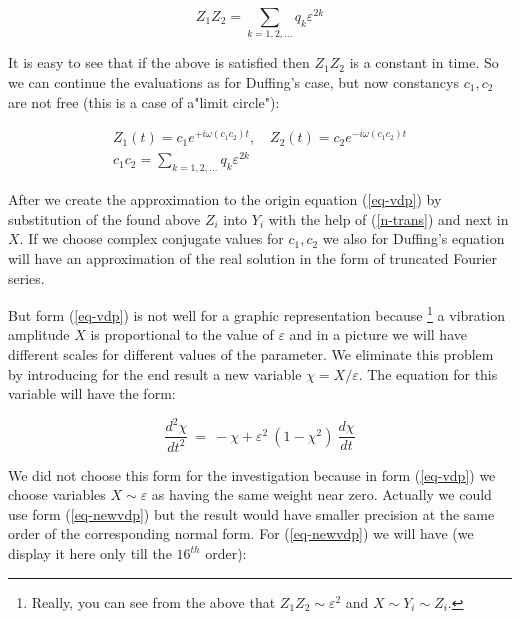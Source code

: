 $$
Z_1 Z_2 = \sum_{k=1,2,\ldots} q_k \varepsilon^{2k}
$$

It is easy to see that if the above is satisfied then $Z_1 Z_2$ is a
constant in time. So we can continue the evaluations as for Duffing's
case, but now constancys $c_1, c_2$ are not free (this is a case of 
a"limit circle"):  


$$ 
\begin{array}{c}
Z_1(t) = c_1 e^{+ i \omega(c_1 c_2) t}, \quad
Z_2(t) = c_2 e^{- i \omega(c_1 c_2) t} \\
c_1 c_2 = \sum_{k=1,2,\ldots} q_k \varepsilon^{2k}
\end{array}
$$


After we create the approximation to the origin equation 
(\ref{eq-vdp}) by substitution of the found above $Z_i$ into $Y_i$ with 
the help of (\ref{n-trans})
and next in $X$. If we choose complex conjugate values for 
$c_1, c_2$ we also for Duffing's equation will have an approximation 
of the real solution in the form of truncated Fourier series.

But  form (\ref{eq-vdp})
is not well for a graphic representation because  \footnote{Really, 
you can see from the above that $Z_1 Z_2 \sim \varepsilon^2$ and 
$X \sim Y_i \sim Z_i$.}
a vibration 
amplitude $X$ is proportional to the value of $\varepsilon$ and
in a picture we will have different scales for different
values of the parameter. We eliminate this problem by introducing
for the end result a new variable $\chi = X/\varepsilon$. The equation
for this variable will have the form:

\begin{equation}
\label{eq-newvdp}
\frac{d^{2}\chi}{dt^2} \ = \ - \chi + 
\varepsilon^2 \ (1 - \chi^2) \ \frac{d\chi}{dt}
\end{equation}

We did not choose this form for the investigation because in form
(\ref{eq-vdp}) we choose variables $X \sim \varepsilon$ as having
the same weight near zero. Actually we could use form (\ref{eq-newvdp})
but the result would have smaller precision at the same order of the
corresponding normal form. For (\ref{eq-newvdp}) we will have (we
display it here only till the $16^{th}$ order):


